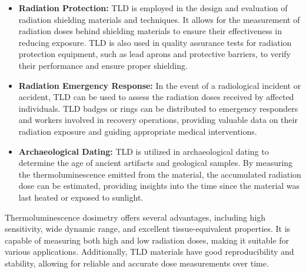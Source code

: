 \documentclass[../introduction.tex]{subfiles}
\begin{document}
\begin{itemize}
            \item \textbf{Radiation Protection: } TLD is employed in the design and evaluation of radiation shielding 
            materials and techniques. It allows for the measurement of radiation doses behind shielding materials to 
            ensure their effectiveness in reducing exposure. TLD is also used in quality assurance tests for radiation 
            protection equipment, such as lead aprons and protective barriers, to verify their performance and ensure 
            proper shielding.

            \item \textbf{Radiation Emergency Response: } In the event of a radiological incident or accident, 
            TLD can be used to assess the radiation doses received by affected individuals. TLD badges or rings can be 
            distributed to emergency responders and workers involved in recovery operations, providing valuable data 
            on their radiation exposure and guiding appropriate medical interventions.

            \item \textbf{Archaeological Dating: } TLD is utilized in archaeological dating to determine the age of 
            ancient artifacts and geological samples. By measuring the thermoluminescence emitted from the material, 
            the accumulated radiation dose can be estimated, providing insights into the time since the material was 
            last heated or exposed to sunlight.

        \end{itemize}

    Thermoluminescence dosimetry offers several advantages, including high sensitivity, wide dynamic range, and 
    excellent tissue-equivalent properties. It is capable of measuring both high and low radiation doses, making it 
    suitable for various applications. Additionally, TLD materials have good reproducibility and stability, allowing 
    for reliable and accurate dose measurements over time.
\end{document}

